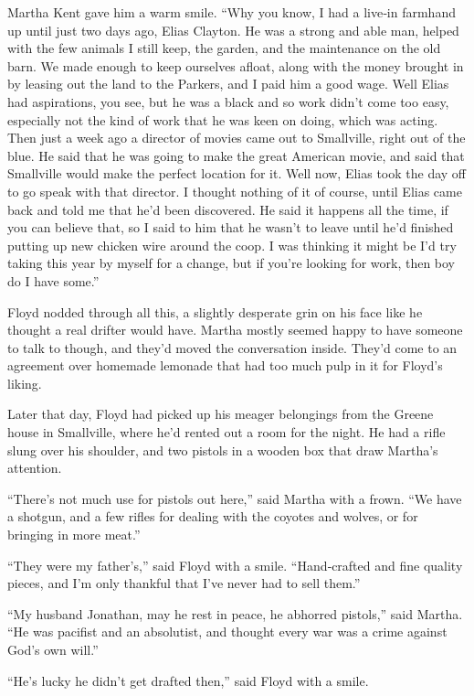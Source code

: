 Martha Kent gave him a warm smile. ``Why you know, I had a live‐in
farmhand up until just two days ago, Elias Clayton. He was a strong and
able man, helped with the few animals I still keep, the garden, and the
maintenance on the old barn. We made enough to keep ourselves afloat,
along with the money brought in by leasing out the land to the Parkers,
and I paid him a good wage. Well Elias had aspirations, you see, but he
was a black and so work didn't come too easy, especially not the kind of
work that he was keen on doing, which was acting. Then just a week ago a
director of movies came out to Smallville, right out of the blue. He
said that he was going to make the great American movie, and said that
Smallville would make the perfect location for it. Well now, Elias took
the day off to go speak with that director. I thought nothing of it of
course, until Elias came back and told me that he'd been discovered. He
said it happens all the time, if you can believe that, so I said to him
that he wasn't to leave until he'd finished putting up new chicken wire
around the coop. I was thinking it might be I'd try taking this year by
myself for a change, but if you're looking for work, then boy do I have
some.''

Floyd nodded through all this, a slightly desperate grin on his face
like he thought a real drifter would have. Martha mostly seemed happy to
have someone to talk to though, and they'd moved the conversation
inside. They'd come to an agreement over homemade lemonade that had too
much pulp in it for Floyd's liking.

Later that day, Floyd had picked up his meager belongings from the
Greene house in Smallville, where he'd rented out a room for the night.
He had a rifle slung over his shoulder, and two pistols in a wooden box
that draw Martha's attention.

``There's not much use for pistols out here,'' said Martha with a frown.
``We have a shotgun, and a few rifles for dealing with the coyotes and
wolves, or for bringing in more meat.''

``They were my father's,'' said Floyd with a smile. ``Hand‐crafted and
fine quality pieces, and I'm only thankful that I've never had to sell
them.''

``My husband Jonathan, may he rest in peace, he abhorred pistols,'' said
Martha. ``He was pacifist and an absolutist, and thought every war was a
crime against God's own will.''

``He's lucky he didn't get drafted then,'' said Floyd with a smile.

